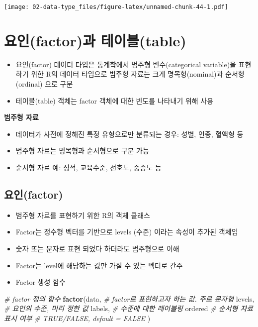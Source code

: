 \documentclass[
  11pt,
]{krantz}
\newenvironment{Shaded}{\begin{snugshade}}{\end{snugshade}}
\newcommand{\CommentTok}[1]{\textcolor[rgb]{0.37,0.37,0.37}{\textit{#1}}}
\newcommand{\KeywordTok}[1]{\textcolor[rgb]{0.27,0.27,0.27}{\textbf{#1}}}
\newcommand{\NormalTok}[1]{#1}
\providecommand{\tightlist}{%
  \setlength{\itemsep}{0pt}\setlength{\parskip}{0pt}}
\begin{document}
\texttt{[image: 02-data-type\_files/figure-latex/unnamed-chunk-44-1.pdf]}

\normalsize

\hypertarget{factor-table}{%
\section{요인(factor)과 테이블(table)}\label{factor-table}}

\begin{itemize}
\tightlist
\item
  요인(factor) 데이터 타입은 통계학에서 범주형 변수(categorical variable)을 표현하기 위한 R의 데이터 타입으로 범주형 자료는 크게 명목형(nominal)과 순서형(ordinal) 으로 구분
\item
  테이블(table) 객체는 factor 객체에 대한 빈도를 나타내기 위해 사용
\end{itemize}

\textbf{범주형 자료}

\begin{itemize}
\tightlist
\item
  데이터가 사전에 정해진 특정 유형으로만 분류되는 경우: 성별, 인종, 혈액형 등
\item
  범주형 자료는 명목형과 순서형으로 구분 가능
\item
  순서형 자료 예: 성적, 교육수준, 선호도, 중증도 등
\end{itemize}

\hypertarget{factor}{%
\subsection{요인(factor)}\label{factor}}

\begin{itemize}
\tightlist
\item
  범주형 자료를 표현하기 위한 R의 객체 클래스
\item
  Factor는 정수형 벡터를 기반으로 levels (수준) 이라는 속성이 추가된 객체임
\item
  숫자 또는 문자로 표현 되었다 하더라도 범주형으로 이해
\item
  Factor는 level에 해당하는 값만 가질 수 있는 벡터로 간주
\item
  Factor 생성 함수
\end{itemize}

\footnotesize

\begin{Shaded}
\begin{Highlighting}[]
\CommentTok{# factor 정의 함수}
\KeywordTok{factor}\NormalTok{(data, }\CommentTok{# factor로 표현하고자 하는 값. 주로 문자형}
\NormalTok{       levels, }\CommentTok{# 요인의 수준, 미리 정한 값}
\NormalTok{       labels, }\CommentTok{# 수준에 대한 레이블링}
\NormalTok{       ordered }\CommentTok{# 순서형 자료 표시 여부}
               \CommentTok{# TRUE/FALSE, default = FALSE}
\NormalTok{       )}
\end{Highlighting}
\end{Shaded}
\end{document}
